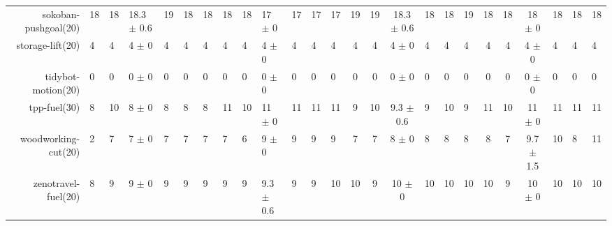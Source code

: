 \begin{center}
\begin{tabular}{|rHHHHHHHHHHHHcccHHH|cccHHH|}
sokoban-pushgoal(20) & 18 & 18 & 18.3 \(\pm\) 0.6 & 19 & 18 & 18 & 18 & 18 & 17 \(\pm\) 0 & 17 & 17 & 17 & 19 & 19 & 18.3 \(\pm\) 0.6 & 18 & 18 & 19 & 18 & 18 & 18 \(\pm\) 0 & 18 & 18 & 18\\
storage-lift(20) & 4 & 4 & 4 \(\pm\) 0 & 4 & 4 & 4 & 4 & 4 & 4 \(\pm\) 0 & 4 & 4 & 4 & 4 & 4 & 4 \(\pm\) 0 & 4 & 4 & 4 & 4 & 4 & 4 \(\pm\) 0 & 4 & 4 & 4\\
tidybot-motion(20) & 0 & 0 & 0 \(\pm\) 0 & 0 & 0 & 0 & 0 & 0 & 0 \(\pm\) 0 & 0 & 0 & 0 & 0 & 0 & 0 \(\pm\) 0 & 0 & 0 & 0 & 0 & 0 & 0 \(\pm\) 0 & 0 & 0 & 0\\
tpp-fuel(30) & 8 & 10 & 8 \(\pm\) 0 & 8 & 8 & 8 & 11 & 10 & 11 \(\pm\) 0 & 11 & 11 & 11 & 9 & 10 & 9.3 \(\pm\) 0.6 & 9 & 10 & 9 & 11 & 10 & 11 \(\pm\) 0 & 11 & 11 & 11\\
woodworking-cut(20) & 2 & 7 & 7 \(\pm\) 0 & 7 & 7 & 7 & 7 & 6 & 9 \(\pm\) 0 & 9 & 9 & 9 & 7 & 7 & 8 \(\pm\) 0 & 8 & 8 & 8 & 8 & 7 & 9.7 \(\pm\) 1.5 & 10 & 8 & 11\\
zenotravel-fuel(20) & 8 & 9 & 9 \(\pm\) 0 & 9 & 9 & 9 & 9 & 9 & 9.3 \(\pm\) 0.6 & 9 & 9 & 10 & 10 & 9 & 10 \(\pm\) 0 & 10 & 10 & 10 & 10 & 9 & 10 \(\pm\) 0 & 10 & 10 & 10\\
\end{tabular}
\end{center}
